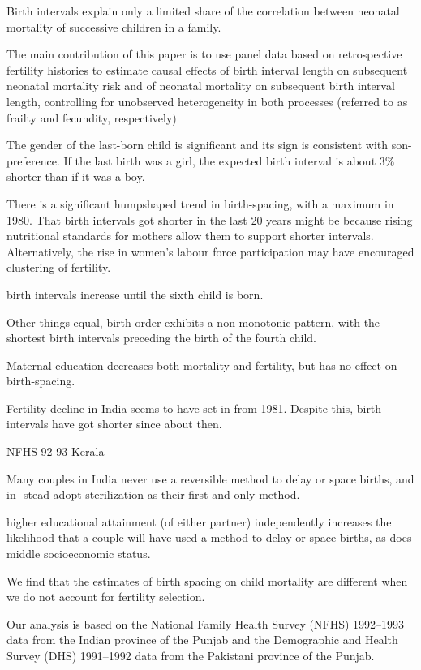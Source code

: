 Birth intervals explain only a limited share of the correlation between
neonatal mortality of successive children in a family.

The main contribution of this paper is to use panel data based on
retrospective fertility histories to estimate causal effects of birth
interval length on subsequent neonatal mortality risk and of neonatal
mortality on subsequent birth interval length, controlling for
unobserved heterogeneity in both processes (referred to as frailty and
fecundity, respectively)


The gender of the last-born child is signiﬁcant and its sign is
consistent with son-preference. If the last birth was a girl, the
expected birth interval is about 3\% shorter than if it was a boy.

There is a signiﬁcant humpshaped trend in birth-spacing, with a maximum
in 1980. That birth intervals got shorter in the last 20 years might be
because rising nutritional standards for mothers allow them to support
shorter intervals. Alternatively, the rise in women’s labour force
participation may have encouraged clustering of fertility.

birth intervals increase until the sixth child is born.

Other things equal, birth-order exhibits a non-monotonic pattern, with
the shortest birth intervals preceding the birth of the fourth child.

Maternal education decreases both mortality and fertility, but has no
effect on birth-spacing.

Fertility decline in India seems to have set in from 1981. Despite this,
birth intervals have got shorter since about then.

\citep{Zavier2000}

NFHS 92-93 Kerala

Many couples in India never use a reversible method to delay or space births, and in-
stead adopt sterilization as their first and only method.

higher educational attainment (of either partner) independently increases the likelihood 
that a couple will have used a method to delay or space births, as does middle 
socioeconomic status. 

\citep{Maitra2008}

We find that the estimates of birth spacing on child mortality are
different when we do not account for fertility selection.

Our analysis is based on the National Family Health Survey (NFHS)
1992–1993 data from the Indian province of the Punjab and the
Demographic and Health Survey (DHS) 1991–1992 data from the Pakistani
province of the Punjab.

